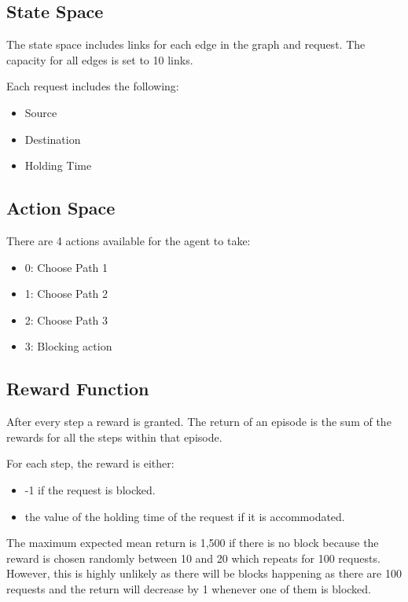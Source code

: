 \documentclass[conference]{IEEEtran}
\begin{document}
\subsection{State Space}
The state space includes links for each edge in the graph and request. The capacity for all edges is set to 10 links.

Each request includes the following:
\begin{itemize}
    \item Source
    \item Destination
    \item Holding Time
\end{itemize}

\subsection{Action Space}
There are 4 actions available for the agent to take:
\begin{itemize}
    \item 0: Choose Path 1
    \item 1: Choose Path 2
    \item 2: Choose Path 3
    \item 3: Blocking action
\end{itemize}
\subsection{Reward Function}
After every step a reward is granted. The return of an episode is the sum of the rewards for all the steps within that episode.

For each step, the reward is either:
\begin{itemize}
    \item -1 if the request is blocked.
    \item the value of the holding time of the request if it is accommodated.
\end{itemize}

The maximum expected mean return is 1,500 if there is no block because the reward is chosen randomly between 10 and 20 which repeats for 100 requests. However, this is highly unlikely as there will be blocks happening as there are 100 requests and the return will decrease by 1 whenever one of them is blocked.
\end{document}
